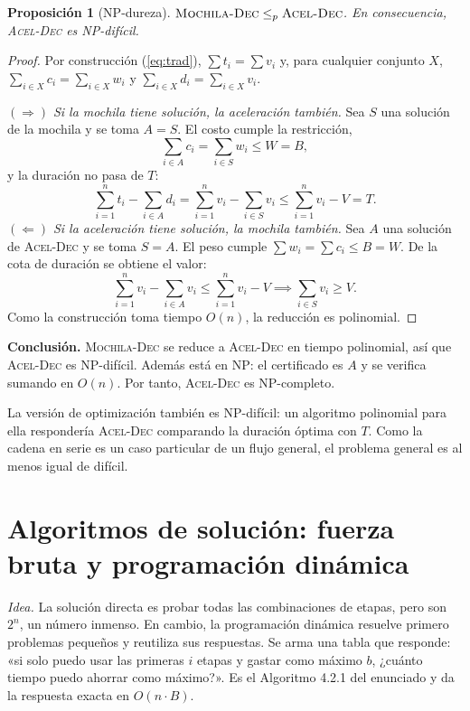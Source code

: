 \documentclass[11pt,a4paper]{article}
\newcommand{\MochilaDec}{\textsc{Mochila-Dec}}
\newcommand{\AcelDec}{\textsc{Acel-Dec}}
\theoremstyle{plano}
\newtheorem{proposicion}{Proposición}[section]
\begin{document}
\begin{proposicion}[NP-dureza]
$\MochilaDec\le_p\AcelDec$. En consecuencia, \AcelDec{} es NP-difícil.
\end{proposicion}
\begin{proof}
Por construcción (\ref{eq:trad}), $\sum t_i=\sum v_i$ y, para cualquier conjunto $X$, $\sum_{i\in X} c_i=\sum_{i\in X} w_i$ y $\sum_{i\in X} d_i=\sum_{i\in X} v_i$.

$(\Rightarrow)$ \textit{Si la mochila tiene solución, la aceleración también.} Sea $S$ una solución de la mochila y se toma $A=S$. El costo cumple la restricción,
\begin{equation}
  \sum_{i\in A} c_i=\sum_{i\in S} w_i\le W=B,
\end{equation}
y la duración no pasa de $T$:
\begin{equation}
  \sum_{i=1}^{n} t_i-\sum_{i\in A} d_i=\sum_{i=1}^{n} v_i-\sum_{i\in S} v_i\le\sum_{i=1}^{n} v_i-V=T.
\end{equation}
$(\Leftarrow)$ \textit{Si la aceleración tiene solución, la mochila también.} Sea $A$ una solución de \AcelDec{} y se toma $S=A$. El peso cumple $\sum w_i=\sum c_i\le B=W$. De la cota de duración se obtiene el valor:
\begin{equation}
  \sum_{i=1}^{n} v_i-\sum_{i\in A} v_i\le\sum_{i=1}^{n} v_i-V \implies \sum_{i\in S} v_i\ge V.
\end{equation}
Como la construcción toma tiempo $O(n)$, la reducción es polinomial.
\end{proof}

\textbf{Conclusión.} \MochilaDec{} se reduce a \AcelDec{} en tiempo polinomial, así que \AcelDec{} es NP-difícil. Además está en NP: el certificado es $A$ y se verifica sumando en $O(n)$. Por tanto, \AcelDec{} es NP-completo.

La versión de optimización también es NP-difícil: un algoritmo polinomial para ella respondería \AcelDec{} comparando la duración óptima con $T$. Como la cadena en serie es un caso particular de un flujo general, el problema general es al menos igual de difícil.

\section{Algoritmos de solución: fuerza bruta y programación dinámica}
\label{sec:sol}

\textit{Idea.} La solución directa es probar todas las combinaciones de etapas, pero son $2^n$, un número inmenso. En cambio, la programación dinámica resuelve primero problemas pequeños y reutiliza sus respuestas. Se arma una tabla que responde: «si solo puedo usar las primeras $i$ etapas y gastar como máximo $b$, ¿cuánto tiempo puedo ahorrar como máximo?». Es el Algoritmo 4.2.1 del enunciado y da la respuesta exacta en $O(n\cdot B)$.
\end{document}
